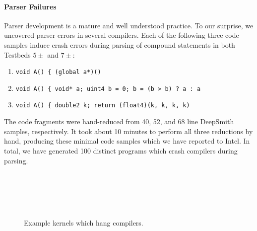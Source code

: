 
\paragraph{Parser Failures} %
Parser development is a mature and well understood practice. To our surprise, we uncovered parser errors in several compilers. Each of the following three code samples induce crash errors during parsing of compound statements in both Testbeds $5\pm$ and $7\pm$:

\begin{enumerate}
\item \texttt{void A() \{ (global a*)()}
\item \texttt{void A() \{ void* a; uint4 b = 0; b = (b > b) ? a : a}
\item \texttt{void A() \{ double2 k; return (float4)(k, k, k, k)}
\end{enumerate}

The code fragments were hand-reduced from 40, 52, and 68 line DeepSmith samples, respectively. It took about 10 minutes to perform all three reductions by hand, producing these minimal code samples which we have reported to Intel. In total, we have generated 100 distinct programs which crash compilers during parsing.

\begin{figure}
  \centering %
  \\%
  \\%
  \\%
  \\%
  \caption{Example kernels which hang compilers.}%
  \label{lst:compiler-hangs}%
\end{figure}

